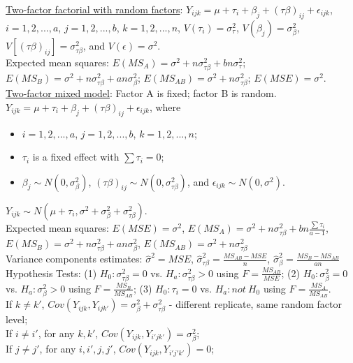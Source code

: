 \documentclass[10pt,landscape]{article}
\begin{document}
\begin{multicols}{3}
\begin{description}
\underline{Two-factor factorial with random factors}: $Y_{ijk} = \mu + \tau_i + \beta_j + (\tau \beta)_{ij} + \epsilon_{ijk}$,  $i = 1,2,...,a$, $j = 1,2,...,b$, $k = 1,2,...,n$, $V(\tau_i) = \sigma_{\tau}^2$, $V(\beta_j) = \sigma_{\beta}^2$, $V[(\tau \beta)_{ij}] = \sigma_{\tau \beta}^2$, and $V(\epsilon) = \sigma^2$. \\
Expected mean squares: $E(MS_A) = \sigma^2 + n\sigma_{\tau \beta}^2 + bn\sigma_{\tau}^2$; $E(MS_B) = \sigma^2 + n\sigma_{\tau \beta}^2 + an\sigma_{\beta}^2$; $E(MS_{AB}) = \sigma^2 + n\sigma_{\tau \beta}^2$; $E(MSE) = \sigma^2$.\\
\underline{Two-factor mixed model}: Factor A is fixed; factor B is random. $Y_{ijk} = \mu + \tau_i + \beta_j + (\tau \beta)_{ij} + \epsilon_{ijk}$, where
\begin{itemize}
	\item $i = 1,2,...,a$, $j = 1,2,...,b$, $k = 1,2,...,n$;
	\item $\tau_i$ is a fixed effect with $\sum \tau_i = 0$;
	\item  $\beta_j \sim N(0, \sigma_\beta ^2)$, $(\tau\beta)_{ij} \sim N(0, \sigma_{\tau\beta}^2)$, and $\epsilon_{ijk} \sim N(0, \sigma^2)$.
\end{itemize}
 $Y_{ijk} \sim N(\mu + \tau_i, \sigma^2 + \sigma_\beta	^2 + \sigma_{\tau\beta}^2)$. \\
Expected mean squares: $E(MSE) = \sigma^2$, $E(MS_A) = \sigma^2 + n\sigma_{\tau\beta}^2 + bn\frac{\sum \tau_i}{a-1}$, $E(MS_B) = \sigma^2 + n\sigma_{\tau\beta}^2 + an\sigma_\beta^2$, $E(MS_{AB}) = \sigma^2 + n\sigma_{\tau\beta}^2$\\
Variance components estimates: $\hat{\sigma}^2 = MSE$, $\hat{\sigma}_{\tau\beta}^2 = \frac{MS_{AB} - MSE}{n}$, $\hat{\sigma}_{\beta}^2 = \frac{MS_{B} - MS_{AB}}{an}$ \\
Hypothesis Tests: (1) $H_0: \sigma_{\tau\beta}^2 = 0$ vs. $H_a: \sigma_{\tau\beta}^2 > 0$ using $F = \frac{MS_{AB}}{MSE}$; (2) $H_0: \sigma_{\beta}^2 = 0$ vs. $H_a: \sigma_{\beta}^2 > 0$ using $F = \frac{MS_{B}}{MS_{AB}}$; (3) $H_0: \tau_i = 0$ vs. $H_a: not\ H_0$ using $F = \frac{MS_{A}}{MS_{AB}}$. \\
If $k\neq k'$, $Cov(Y_{ijk}, Y_{ijk'}) = \sigma_{\beta}^2 + \sigma_{\tau \beta}^2$ - {\tiny{different replicate, same random factor level}}; \\
If $i\neq i'$, for any $k, k'$, $Cov(Y_{ijk}, Y_{i'jk'}) = \sigma_{\beta}^2$; \\
If $j\neq j'$, for any $i, i', j, j'$, $Cov(Y_{ijk}, Y_{i'j'k'}) = 0$; \\


\end{description}
\end{multicols}
\end{document}
